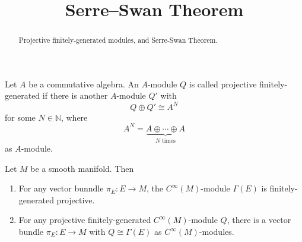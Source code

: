 \documentclass{ximera}
\title{Serre--Swan Theorem}
\begin{document}
    \begin{abstract} Projective finitely-generated modules, and Serre-Swan Theorem. \end{abstract}
    \maketitle

\begin{definition}
    Let $A$ be a commutative algebra. An $A$-module $Q$ is called projective finitely-generated if there is another $A$-module $Q'$ with 
    \[     Q \oplus Q' \cong A ^N   \]
    for some $N \in \mathbb{N}$, where
    \[    A^N = \underbrace{A \oplus \cdots \oplus A  }_{N \text{ times}}        \]
    as $A$-module. 
\end{definition}


\begin{theorem}
Let $M$ be a smooth manifold. Then
\begin{enumerate}
    \item For any vector bunndle $\pi_E : E \to M$, the $C^{\infty} (M)$-module $\Gamma (E)$ is finitely-generated projective. 
    \item For any projective finitely-generated $C^{\infty}(M)$-module $Q$, there is a vector bundle $\pi_E : E \to M$ with $Q \cong \Gamma (E)$ as $C^{\infty}(M)$-modules.
\end{enumerate}
\end{theorem}
\end{document}

